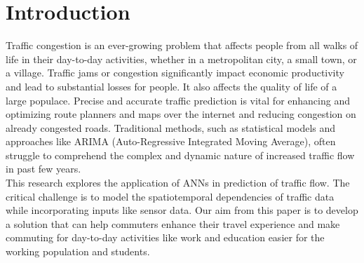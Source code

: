 \documentclass[conference]{IEEEtran}
\begin{document}
\section{Introduction}
Traffic congestion is an ever-growing problem that affects people from all walks of life in their day-to-day activities, whether in a metropolitan city, a small town, or a village. Traffic jams or congestion significantly impact economic productivity and lead to substantial losses for people. It also affects the quality of life of a large populace. Precise and accurate traffic prediction is vital for enhancing and optimizing route planners and maps over the internet and reducing congestion on already congested roads. Traditional methods, such as statistical models and approaches like ARIMA (Auto-Regressive Integrated Moving Average), often struggle to comprehend the complex and dynamic nature of increased traffic flow in past few years.\\

This research explores the application of ANNs in prediction of traffic flow. The critical challenge is to model the spatiotemporal dependencies of traffic data while incorporating inputs like sensor data. Our aim from this paper is to develop a solution that can help commuters enhance their travel experience and make commuting for day-to-day activities like work and education easier for the working population and students.
\end{document}
